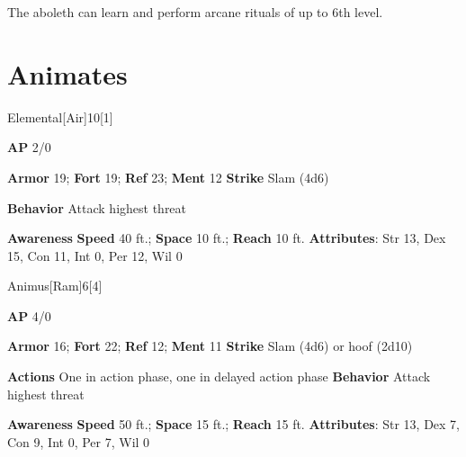 The aboleth can learn and perform arcane rituals of up to 6th level.

\section{Animates}
\begin{monsection}{Elemental}[Air]{10}[1]
\vspace{-1em}\vspace{-1em}
\begin{spellcontent}
\begin{spelltargetinginfo}
{\textbf{AP} 2/0}

\pari \textbf{Armor} 19;
\textbf{Fort} 19;
\textbf{Ref} 23;
\textbf{Ment} 12
\pari \textbf{Strike} Slam  (4d6)



\pari \textbf{Behavior} Attack highest threat
\end{spelltargetinginfo}
\end{spellcontent}

\begin{monsterfooter}
\pari \textbf{Awareness} 
\pari \textbf{Speed} 40 ft.;
\textbf{Space} 10 ft.;
\textbf{Reach} 10 ft.
\pari \textbf{Attributes}:
Str 13,
Dex 15,
Con 11,
Int 0,
Per 12,
Wil 0
\end{monsterfooter}
\end{monsection}

\begin{monsection}{Animus}[Ram]{6}[4]
\vspace{-1em}\vspace{-1em}
\begin{spellcontent}
\begin{spelltargetinginfo}
{\textbf{AP} 4/0}

\pari \textbf{Armor} 16;
\textbf{Fort} 22;
\textbf{Ref} 12;
\textbf{Ment} 11
\pari \textbf{Strike} Slam  (4d6) or hoof  (2d10)


\pari \textbf{Actions} One in action phase, one in delayed action phase
\pari \textbf{Behavior} Attack highest threat
\end{spelltargetinginfo}
\end{spellcontent}

\begin{monsterfooter}
\pari \textbf{Awareness} 
\pari \textbf{Speed} 50 ft.;
\textbf{Space} 15 ft.;
\textbf{Reach} 15 ft.
\pari \textbf{Attributes}:
Str 13,
Dex 7,
Con 9,
Int 0,
Per 7,
Wil 0
\end{monsterfooter}
\end{monsection}


